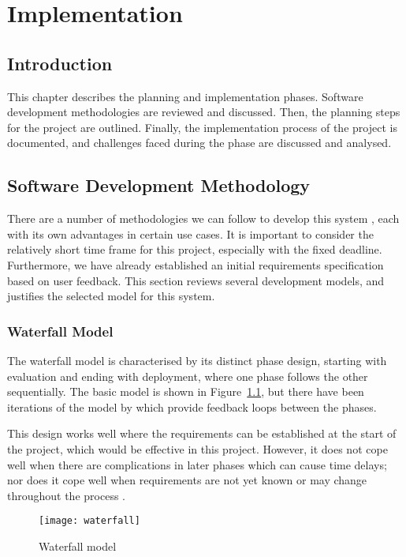 \chapter{Implementation}
\label{ch:implementation}
\section{Introduction}
This chapter describes the planning and implementation phases. Software development methodologies are reviewed and discussed. Then, the planning steps for the project are outlined. Finally, the implementation process of the project is documented, and challenges faced during the phase are discussed and analysed.

\section{Software Development Methodology}
There are a number of methodologies we can follow to develop this system \cite{sdlc2010}, each with its own advantages in certain use cases. It is important to consider the relatively short time frame for this project, especially with the fixed deadline. Furthermore, we have already established an initial requirements specification based on user feedback. This section reviews several development models, and justifies the selected model for this system.

\subsection{Waterfall Model}
The waterfall model \cite{royce1987managing} is characterised by its distinct phase design, starting with evaluation and ending with deployment, where one phase follows the other sequentially. The basic model is shown in Figure~\ref{fig:waterfall}, but there have been iterations of the model by \citet{royce1987managing} which provide feedback loops between the phases.

This design works well where the requirements can be established at the start of the project, which would be effective in this project. However, it does not cope well when there are complications in later phases which can cause time delays; nor does it cope well when requirements are not yet known or may change throughout the process \cite{sdlc2010}.

	\begin{figure}
		\centering
		\texttt{[image: waterfall]}
		\caption{Waterfall model \cite{sdlc2010}}
		\label{fig:waterfall}
	\end{figure}

